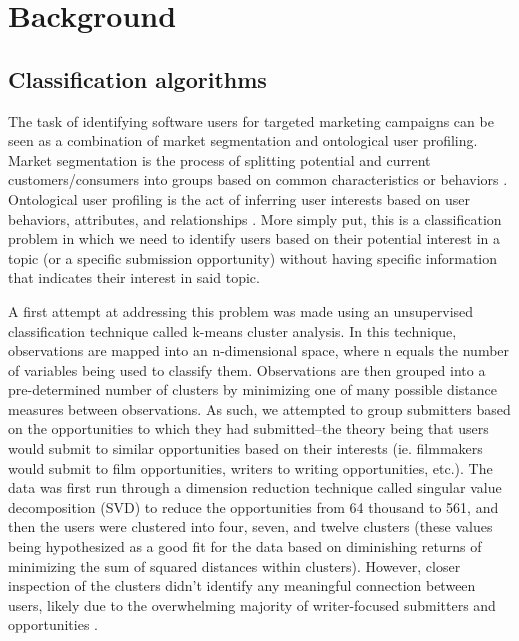 \documentclass[12pt]{report}   %
\begin{document}
\chapter{Background}
\section{Classification algorithms}\label{classification}

The task of identifying software users for targeted marketing campaigns can be seen as a combination of market segmentation and ontological user profiling. Market segmentation is the process of splitting potential and current customers/consumers into groups based on common characteristics or behaviors \cite{johnson_1971}. Ontological user profiling is the act of inferring user interests based on user behaviors, attributes, and relationships \cite{middleton_shadbolt_roure_2004}. More simply put, this is a classification problem in which we need to identify users based on their potential interest in a topic (or a specific submission opportunity) without having specific information that indicates their interest in said topic. 

A first attempt at addressing this problem was made using an unsupervised classification technique called k-means cluster analysis. In this technique, observations are mapped into an n-dimensional space, where n equals the number of variables being used to classify them. Observations are then grouped into a pre-determined number of clusters by minimizing one of many possible distance measures between observations\cite{jain_2010}. As such, we attempted to group submitters based on the opportunities to which they had submitted--the theory being that users would submit to similar opportunities based on their interests (ie. filmmakers would submit to film opportunities, writers to writing opportunities, etc.). The data was first run through a dimension reduction technique called singular value decomposition (SVD) to reduce the opportunities from 64 thousand to 561, and then the users were clustered into four, seven, and twelve clusters (these values being hypothesized as a good fit for the data based on diminishing returns of minimizing the sum of squared distances within clusters). However, closer inspection of the clusters didn't identify any meaningful connection between users, likely due to the overwhelming majority of writer-focused submitters and opportunities \cite{marbut_2018}.
\end{document}
